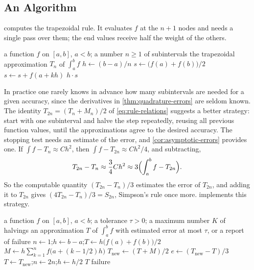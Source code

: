 \subsection{An Algorithm}

 computes the trapezoidal rule. It evaluates $f$ at the $n+1$ nodes and needs a single pass over them; the end values receive half the weight of the others.

\begin{algorithm}
\begin{algorithmic}[1]
\Require a function $f$ on $[a,b]$, $a<b$; a number $n\ge1$ of subintervals
\Ensure the trapezoidal approximation $T_n$ of $\int_a^bf$
\State $h\gets(b-a)/n$
\State $s\gets\bigl(f(a)+f(b)\bigr)/2$
  \State $s\gets s+f(a+kh)$
\EndFor
\State \Return $h\cdot s$
\end{algorithmic}
\caption{The composite trapezoidal rule with $n$ equal subintervals.}
\label{alg:trapezoid}
\end{algorithm}

In practice one rarely knows in advance how many subintervals are needed for a given accuracy, since the derivatives in \cref{thm:quadrature-errors} are seldom known. The identity $T_{2n}=(T_n+M_n)/2$ of \eqref{eq:rule-relations} suggests a better strategy: start with one subinterval and halve the step repeatedly, reusing all previous function values, until the approximations agree to the desired accuracy. The stopping test needs an estimate of the error, and \cref{cor:asymptotic-errors} provides one. If $\int f-T_n\approx Ch^2$, then $\int f-T_{2n}\approx Ch^2/4$, and subtracting,
\[
T_{2n}-T_n\approx\frac34Ch^2\approx3\Bigl(\int_a^bf-T_{2n}\Bigr).
\]
So the computable quantity $(T_{2n}-T_n)/3$ estimates the error of $T_{2n}$, and adding it to $T_{2n}$ gives $(4T_{2n}-T_n)/3=S_{2n}$, Simpson's rule once more.  implements this strategy.

\begin{algorithm}
\begin{algorithmic}[1]
\Require a function $f$ on $[a,b]$, $a<b$; a tolerance $\tau>0$; a maximum number $K$ of halvings
\Ensure an approximation $T$ of $\int_a^bf$ with estimated error at most $\tau$, or a report of failure
\State $n\gets1$;\quad $h\gets b-a$;\quad $T\gets h\bigl(f(a)+f(b)\bigr)/2$
  \State $M\gets h\sum_{k=1}^{n}f\bigl(a+(k-1/2)h\bigr)$ 
  \State $T_{\mathrm{new}}\gets(T+M)/2$ 
  \State $e\gets(T_{\mathrm{new}}-T)/3$ 
  \State $T\gets T_{\mathrm{new}}$;\quad $n\gets2n$;\quad $h\gets h/2$
   \Return $T$
  \EndIf
\EndFor
\State \Return failure 
\end{algorithmic}
\caption{The trapezoidal rule with repeated halving of the step. After $j$ passes it has evaluated $f$ at $2^j+1$ points, each once. Returning $T+e$ instead of $T$ gives Simpson's rule $S_n$.}
\label{alg:trapezoid-halving}
\end{algorithm}

